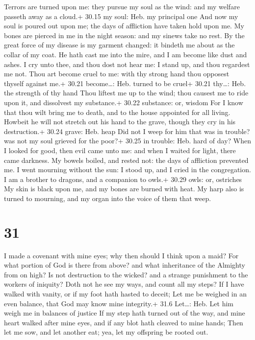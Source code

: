  Terrors are turned upon me: they pursue my soul as the
wind: and my welfare passeth away as a cloud.+ 30.15 my soul: Heb. my
principal one  And now my soul is poured out upon me; the
days of affliction have taken hold upon me.  My bones are
pierced in me in the night season: and my sinews take no rest.
 By the great force of my disease is my garment changed: it
bindeth me about as the collar of my coat.  He hath cast me
into the mire, and I am become like dust and ashes.  I cry
unto thee, and thou dost not hear me: I stand up, and thou regardest me
not.  Thou art become cruel to me: with thy strong hand
thou opposest thyself against me.+ 30.21 become\ldots: Heb. turned to be
cruel+ 30.21 thy\ldots: Heb. the strength of thy hand  Thou
liftest me up to the wind; thou causest me to ride upon it, and
dissolvest my substance.+ 30.22 substance: or, wisdom  For
I know that thou wilt bring me to death, and to the house appointed for
all living.  Howbeit he will not stretch out his hand to
the grave, though they cry in his destruction.+ 30.24 grave: Heb. heap
 Did not I weep for him that was in trouble? was not my
soul grieved for the poor?+ 30.25 in trouble: Heb. hard of day?
 When I looked for good, then evil came unto me: and when I
waited for light, there came darkness.  My bowels boiled,
and rested not: the days of affliction prevented me.  I
went mourning without the sun: I stood up, and I cried in the
congregation.  I am a brother to dragons, and a companion
to owls.+ 30.29 owls: or, ostriches  My skin is black upon
me, and my bones are burned with heat.  My harp also is
turned to mourning, and my organ into the voice of them that weep.

\hypertarget{section-30}{%
\section{31}\label{section-30}}

 I made a covenant with mine eyes; why then should I think
upon a maid?  For what portion of God is there from above?
and what inheritance of the Almighty from on high?  Is not
destruction to the wicked? and a strange punishment to the workers of
iniquity?  Doth not he see my ways, and count all my steps?
 If I have walked with vanity, or if my foot hath hasted to
deceit;  Let me be weighed in an even balance, that God may
know mine integrity.+ 31.6 Let\ldots: Heb. Let him weigh me in balances
of justice  If my step hath turned out of the way, and mine
heart walked after mine eyes, and if any blot hath cleaved to mine
hands;  Then let me sow, and let another eat; yea, let my
offspring be rooted out.


